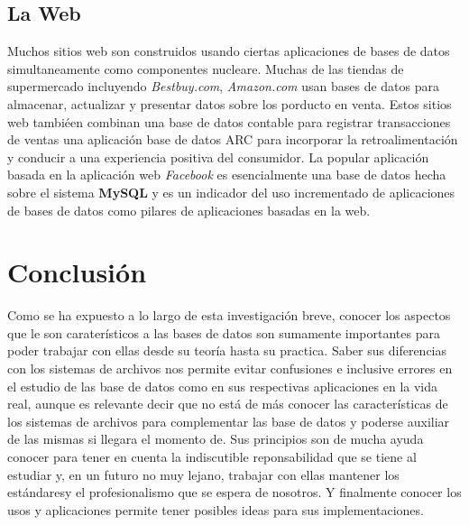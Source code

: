 \documentclass[letterpaper, 12pt]{article}
\begin{document}
\begin{justify}
        \subsection{La Web}
        \justify
        Muchos sitios web son construidos usando ciertas aplicaciones de bases de datos simultaneamente como componentes nucleare. Muchas de las tiendas de supermercado incluyendo
        \emph{Bestbuy.com},  \emph{Amazon.com} usan bases de datos para almacenar, actualizar y presentar datos sobre los porducto en venta. Estos sitios web tambiéen combinan una base de datos
        contable para registrar transacciones de ventas una aplicación base de datos ARC para incorporar la retroalimentación y conducir a una experiencia positiva del consumidor. La popular aplicación basada
        en la aplicación web \emph{Facebook} es esencialmente una base de datos hecha sobre el sistema \textbf{MySQL} y es un indicador del uso incrementado de aplicaciones de bases de datos como pilares de
        aplicaciones basadas en la web.

        \section{Conclusión} %
        \justify
        Como se ha expuesto a lo largo de esta investigación breve, conocer los aspectos que le son caraterísticos a las bases de datos son sumamente importantes para poder trabajar con ellas desde su teoría hasta su practica. Saber sus diferencias 
        con los sistemas de archivos nos permite evitar confusiones e inclusive errores en el estudio de las base de datos como en sus respectivas aplicaciones en la vida real, aunque es relevante decir que no está de más conocer las características 
        de los sistemas de archivos para complementar las base de datos y poderse auxiliar de las mismas si llegara el momento de. Sus principios son de mucha ayuda conocer para tener en cuenta la indiscutible reponsabilidad que se tiene al estudiar y, 
        en un futuro no muy lejano, trabajar con ellas mantener los estándaresy el profesionalismo que se espera de nosotros. Y finalmente conocer los usos y aplicaciones permite tener posibles ideas para sus implementaciones. 

    \end{justify}

    {
      \fancyhf{}
      \renewcommand\headrulewidth{0pt}
      \renewcommand\footrulewidth{0pt}
      \fancyfoot[R]{\thepage}
    } %

    \newpage
        \thispagestyle{myplain} %
        \printbibliography
\end{document}
